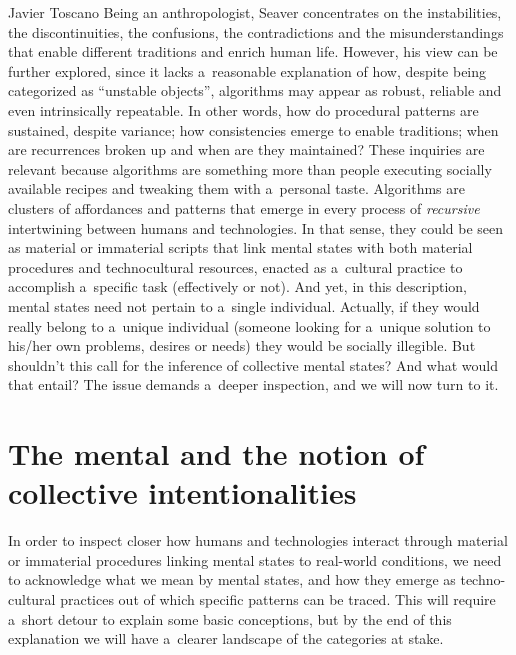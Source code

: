 \begin{artengenv}{Javier Toscano}
Being an anthropologist, Seaver concentrates on the instabilities, the discontinuities, the confusions, the contradictions and the misunderstandings that enable different traditions and enrich human life. However, his view can be further explored, since it lacks a~reasonable explanation of how, despite being categorized as ``unstable objects'', algorithms may appear as robust, reliable and even intrinsically repeatable. In other words, how do procedural patterns are sustained, despite variance; how consistencies emerge to enable traditions; when are recurrences broken up and when are they maintained? These inquiries are relevant because algorithms are something more than people executing socially available recipes and tweaking them with a~personal taste. Algorithms are clusters of affordances and patterns that emerge in every process of \textit{recursive} intertwining between humans and technologies. In that sense, they could be seen as material or immaterial scripts that link mental states with both material procedures and technocultural resources, enacted as a~cultural practice to accomplish a~specific task (effectively or not). And yet, in this description, mental states need not pertain to a~single individual. Actually, if they would really belong to a~unique individual (someone looking for a~unique solution to his/her own problems, desires or needs) they would be socially illegible. But shouldn't this call for the inference of collective mental states? And what would that entail? The issue demands a~deeper inspection, and we will now turn to it.

\section*{The mental and the notion of collective intentionalities}
In order to inspect closer how humans and technologies interact through material or immaterial procedures linking mental states to real-world conditions, we need to acknowledge what we mean by mental states, and how they emerge as techno-cultural practices out of which specific patterns can be traced. This will require a~short detour to explain some basic conceptions, but by the end of this explanation we will have a~clearer landscape of the categories at stake.


\end{artengenv}
